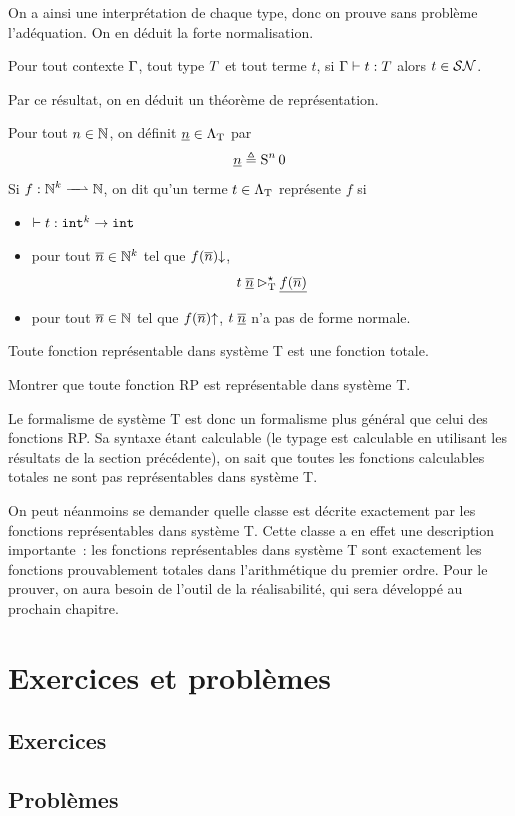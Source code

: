 On a ainsi une interprétation de chaque type, donc on prouve sans problème
l'adéquation. On en déduit la forte normalisation.

\begin{theorem}
  Pour tout contexte $\Gamma$, tout type $T$ et tout terme $t$, si
  $\Gamma\mathrel{\vdash} t : T$ alors $t \in \mathcal{SN}$.
\end{theorem}

Par ce résultat, on en déduit un théorème de représentation.

\begin{definition}
  Pour tout $n \in \mathbb N$, on définit $\underline{n} \in \Lambda_{\mathrm{T}}$ par
  \[\underline{n} \triangleq \operatorname{S}^n 0\]
  Si $\makeFunNamePartial{f}{\bN^k}{\bN}$, on dit qu'un terme
  $t \in \Lambda_{\mathrm{T}}$ représente $f$ si
  \begin{itemize}
  \item $\mathrel{\vdash} t : {\normalfont\texttt{int}}^k \to {\normalfont\texttt{int}}$
  \item pour tout $\overline{n} \in \mathbb N^k$ tel que $f(\overline{n})\mathbin{\downarrow}$,
    \[t\;\underline{\overline{n}} \rhd_{\mathrm{T}}^{\mathord{\star}} \underline{f(\overline{n})}\]
  \item pour tout $\overline{n} \in \mathbb N$ tel que
    $f(\overline{n})\mathbin{\uparrow}$, $t\;\underline{\overline{n}}$ n'a pas
    de forme normale.
  \end{itemize}
\end{definition}

\begin{theorem}
  Toute fonction représentable dans système T est une fonction totale.
\end{theorem}

\begin{exercise}
  Montrer que toute fonction RP est représentable dans système T.
\end{exercise}

Le formalisme de système T est donc un formalisme plus général que celui des
fonctions RP. Sa syntaxe étant calculable (le typage est calculable en utilisant
les résultats de la section précédente), on sait que toutes les fonctions
calculables totales ne sont pas représentables dans système T.

On peut néanmoins se demander quelle classe est décrite exactement par les
fonctions représentables dans système T. Cette classe a en effet une description
importante~: les fonctions représentables dans système T sont exactement les
fonctions prouvablement totales dans l'arithmétique du premier ordre. Pour le
prouver, on aura besoin de l'outil de la réalisabilité, qui sera développé au
prochain chapitre.

\clearpage

\section{Exercices et problèmes}

\subsection{Exercices}

\clearpage

\subsection{Problèmes}
